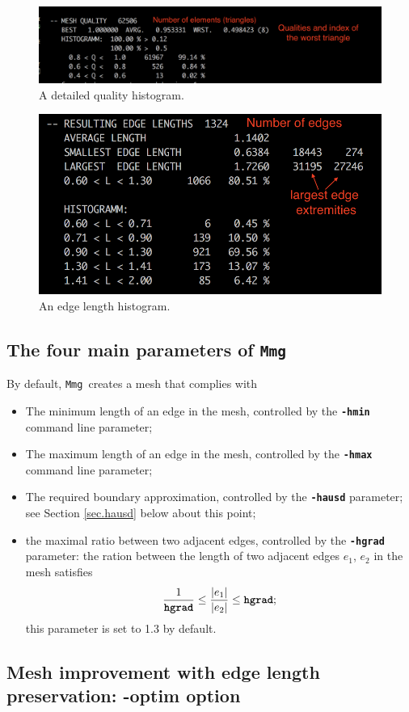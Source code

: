 \documentclass{article}
\newcommand{\ttb}[1]{\texttt{\textbf{#1}}}
\newcommand{\mmg}{\texttt{Mmg}}
\begin{document}
\begin{figure}
\centering
\includegraphics[width=0.8\linewidth]{qual_histo}
\caption{\label{qual_histo}
A detailed quality histogram.}
\end{figure}

\begin{figure}
\centering
\includegraphics[width=0.8\linewidth]{edge_histo}
\caption{\label{edge_histo}
An edge length histogram.}
\end{figure}

\subsection{The four main parameters of \mmg}
By default, \mmg\ creates a mesh
that complies with 
\begin{itemize}
\item The minimum length of an edge in the mesh, controlled by the \ttb{-hmin} command line parameter; 
\item The maximum length of an edge in the mesh, controlled by the \ttb{-hmax} command line parameter; 
\item The required boundary approximation, controlled by the \ttb{-hausd} parameter; see Section \ref{sec.hausd} below about this point; 
\item the maximal ratio between two adjacent edges, controlled by the \ttb{-hgrad} parameter: the ration between the length of two adjacent edges $e_1$, $e_2$ in the mesh satisfies
$$ \frac{1}{\ttb{hgrad}} \leq \frac{| e_1|}{| e_2|} \leq \ttb{hgrad}; $$
this parameter is set to 1.3 by default. 
\end{itemize} 

\subsection{Mesh improvement with edge length preservation: -optim option}
\end{document}
